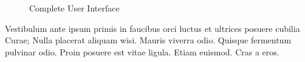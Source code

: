\begin{figure}[htbp]
	\centering
	 \qquad
	\caption{Complete User Interface}
	\label{fig:user_interface}
\end{figure}

Vestibulum ante ipsum primis in faucibus orci luctus et ultrices posuere cubilia Curae; Nulla placerat aliquam wisi. Mauris viverra odio. Quisque fermentum pulvinar odio. Proin posuere est vitae ligula. Etiam euismod. Cras a eros.